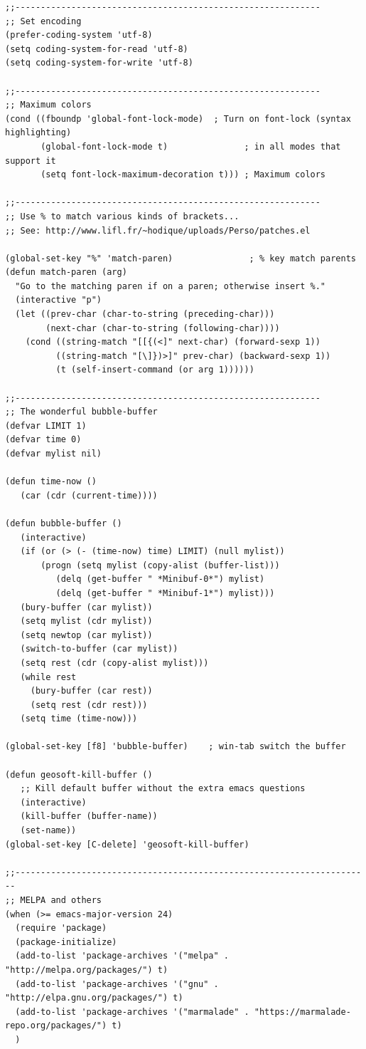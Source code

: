 \documentclass[12pt,spanish,]{scrartcl}
\begin{document}
\begin{verbatim}
;;------------------------------------------------------------
;; Set encoding
(prefer-coding-system 'utf-8)
(setq coding-system-for-read 'utf-8)
(setq coding-system-for-write 'utf-8)

;;------------------------------------------------------------
;; Maximum colors
(cond ((fboundp 'global-font-lock-mode)  ; Turn on font-lock (syntax highlighting)
       (global-font-lock-mode t)               ; in all modes that support it
       (setq font-lock-maximum-decoration t))) ; Maximum colors

;;------------------------------------------------------------
;; Use % to match various kinds of brackets...
;; See: http://www.lifl.fr/~hodique/uploads/Perso/patches.el

(global-set-key "%" 'match-paren)               ; % key match parents
(defun match-paren (arg)
  "Go to the matching paren if on a paren; otherwise insert %."
  (interactive "p")
  (let ((prev-char (char-to-string (preceding-char)))
        (next-char (char-to-string (following-char))))
    (cond ((string-match "[[{(<]" next-char) (forward-sexp 1))
          ((string-match "[\]})>]" prev-char) (backward-sexp 1))
          (t (self-insert-command (or arg 1))))))

;;------------------------------------------------------------
;; The wonderful bubble-buffer
(defvar LIMIT 1)
(defvar time 0)
(defvar mylist nil)

(defun time-now ()
   (car (cdr (current-time))))

(defun bubble-buffer ()
   (interactive)
   (if (or (> (- (time-now) time) LIMIT) (null mylist))
       (progn (setq mylist (copy-alist (buffer-list)))
          (delq (get-buffer " *Minibuf-0*") mylist)
          (delq (get-buffer " *Minibuf-1*") mylist)))
   (bury-buffer (car mylist))
   (setq mylist (cdr mylist))
   (setq newtop (car mylist))
   (switch-to-buffer (car mylist))
   (setq rest (cdr (copy-alist mylist)))
   (while rest
     (bury-buffer (car rest))
     (setq rest (cdr rest)))
   (setq time (time-now))) 

(global-set-key [f8] 'bubble-buffer)    ; win-tab switch the buffer

(defun geosoft-kill-buffer ()
   ;; Kill default buffer without the extra emacs questions
   (interactive)
   (kill-buffer (buffer-name))
   (set-name)) 
(global-set-key [C-delete] 'geosoft-kill-buffer) 

;;----------------------------------------------------------------------
;; MELPA and others
(when (>= emacs-major-version 24)
  (require 'package)
  (package-initialize)
  (add-to-list 'package-archives '("melpa" . "http://melpa.org/packages/") t)
  (add-to-list 'package-archives '("gnu" . "http://elpa.gnu.org/packages/") t)
  (add-to-list 'package-archives '("marmalade" . "https://marmalade-repo.org/packages/") t)
  )


\end{verbatim}
\end{document}
